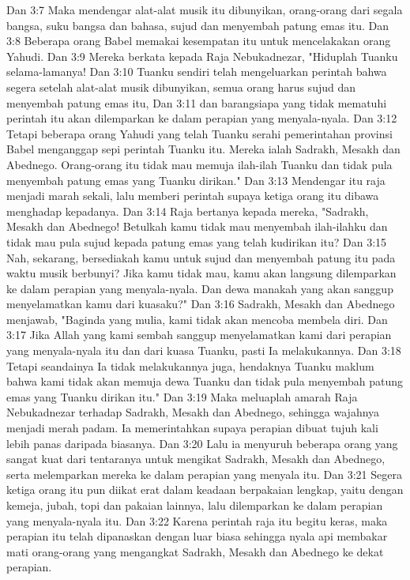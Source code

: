 Dan 3:7  Maka mendengar alat-alat musik itu dibunyikan, orang-orang dari segala bangsa, suku bangsa dan bahasa, sujud dan menyembah patung emas itu.
Dan 3:8  Beberapa orang Babel memakai kesempatan itu untuk mencelakakan orang Yahudi.
Dan 3:9  Mereka berkata kepada Raja Nebukadnezar, "Hiduplah Tuanku selama-lamanya!
Dan 3:10  Tuanku sendiri telah mengeluarkan perintah bahwa segera setelah alat-alat musik dibunyikan, semua orang harus sujud dan menyembah patung emas itu,
Dan 3:11  dan barangsiapa yang tidak mematuhi perintah itu akan dilemparkan ke dalam perapian yang menyala-nyala.
Dan 3:12  Tetapi beberapa orang Yahudi yang telah Tuanku serahi pemerintahan provinsi Babel menganggap sepi perintah Tuanku itu. Mereka ialah Sadrakh, Mesakh dan Abednego. Orang-orang itu tidak mau memuja ilah-ilah Tuanku dan tidak pula menyembah patung emas yang Tuanku dirikan."
Dan 3:13  Mendengar itu raja menjadi marah sekali, lalu memberi perintah supaya ketiga orang itu dibawa menghadap kepadanya.
Dan 3:14  Raja bertanya kepada mereka, "Sadrakh, Mesakh dan Abednego! Betulkah kamu tidak mau menyembah ilah-ilahku dan tidak mau pula sujud kepada patung emas yang telah kudirikan itu?
Dan 3:15  Nah, sekarang, bersediakah kamu untuk sujud dan menyembah patung itu pada waktu musik berbunyi? Jika kamu tidak mau, kamu akan langsung dilemparkan ke dalam perapian yang menyala-nyala. Dan dewa manakah yang akan sanggup menyelamatkan kamu dari kuasaku?"
Dan 3:16  Sadrakh, Mesakh dan Abednego menjawab, "Baginda yang mulia, kami tidak akan mencoba membela diri.
Dan 3:17  Jika Allah yang kami sembah sanggup menyelamatkan kami dari perapian yang menyala-nyala itu dan dari kuasa Tuanku, pasti Ia melakukannya.
Dan 3:18  Tetapi seandainya Ia tidak melakukannya juga, hendaknya Tuanku maklum bahwa kami tidak akan memuja dewa Tuanku dan tidak pula menyembah patung emas yang Tuanku dirikan itu."
Dan 3:19  Maka meluaplah amarah Raja Nebukadnezar terhadap Sadrakh, Mesakh dan Abednego, sehingga wajahnya menjadi merah padam. Ia memerintahkan supaya perapian dibuat tujuh kali lebih panas daripada biasanya.
Dan 3:20  Lalu ia menyuruh beberapa orang yang sangat kuat dari tentaranya untuk mengikat Sadrakh, Mesakh dan Abednego, serta melemparkan mereka ke dalam perapian yang menyala itu.
Dan 3:21  Segera ketiga orang itu pun diikat erat dalam keadaan berpakaian lengkap, yaitu dengan kemeja, jubah, topi dan pakaian lainnya, lalu dilemparkan ke dalam perapian yang menyala-nyala itu.
Dan 3:22  Karena perintah raja itu begitu keras, maka perapian itu telah dipanaskan dengan luar biasa sehingga nyala api membakar mati orang-orang yang mengangkat Sadrakh, Mesakh dan Abednego ke dekat perapian.
